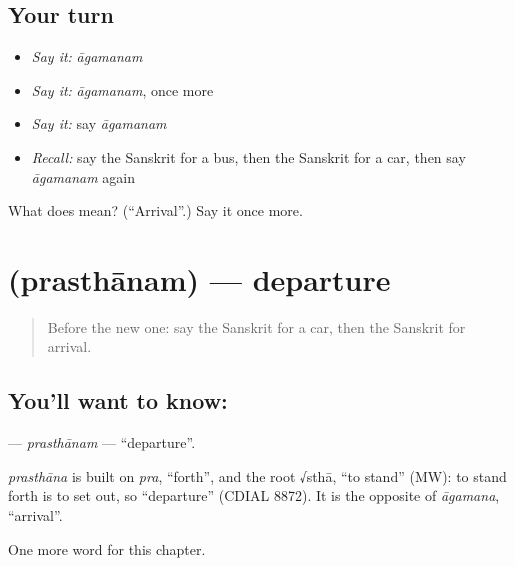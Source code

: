 \subsection*{Your turn}
\begin{itemize}
\raggedright
  \item \emph{Say it:} \emph{āgamanam}
  \item \emph{Say it:} \emph{āgamanam}, once more
  \item \emph{Say it:} say \emph{āgamanam}
  \item \emph{Recall:} say the Sanskrit for a bus, then the Sanskrit for a car, then say \emph{āgamanam} again
\end{itemize}

\begin{tcolorbox}[breakable,colback=teal!4,colframe=teal!35!black,title={Before you move on}]
What does  mean? (\textquotedblleft{}Arrival\textquotedblright{}.) Say it once more.
\end{tcolorbox}
\section[\texorpdfstring{\sk{प्रस्थानम्} (prasthānam)}{प्रस्थानम् (prasthānam)}]{ (prasthānam) — departure}

\label{lesson:SA-C257-prasthanam}



\begin{quote}
Before the new one: say the Sanskrit for a car, then the Sanskrit for arrival.
\end{quote}

\subsection*{You'll want to know: }
\textbf{} — \emph{prasthānam} — \textquotedblleft{}departure\textquotedblright{}.

\begin{cousinweb}
\emph{prasthāna} is built on \emph{pra}, \textquotedblleft{}forth\textquotedblright{}, and the root √sthā, \textquotedblleft{}to stand\textquotedblright{} (MW): to stand forth is to set out, so \textquotedblleft{}departure\textquotedblright{} (CDIAL 8872). It is the opposite of \emph{āgamana}, \textquotedblleft{}arrival\textquotedblright{}.
\end{cousinweb}

\begin{grammarlens}[title={What you've built}]
One more word for this chapter.
\end{grammarlens}

